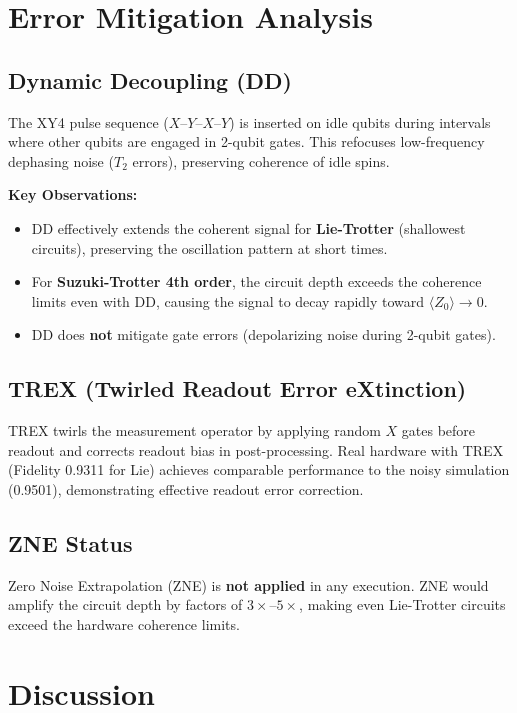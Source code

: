 \documentclass[11pt,a4paper]{article}
\begin{document}
\section{Error Mitigation Analysis}

\subsection{Dynamic Decoupling (DD)}
The XY4 pulse sequence ($X$--$Y$--$X$--$Y$) is inserted on idle qubits during intervals where other qubits are engaged in 2-qubit gates. 
This refocuses low-frequency dephasing noise ($T_2$ errors), preserving coherence of idle spins.

\textbf{Key Observations:}
\begin{itemize}
    \item DD effectively extends the coherent signal for \textbf{Lie-Trotter} (shallowest circuits), preserving the oscillation pattern at short times.
    \item For \textbf{Suzuki-Trotter 4th order}, the circuit depth exceeds the coherence limits even with DD, causing the signal to decay rapidly toward $\langle Z_0 \rangle \to 0$.
    \item DD does \textbf{not} mitigate gate errors (depolarizing noise during 2-qubit gates).
\end{itemize}

\subsection{TREX (Twirled Readout Error eXtinction)}
TREX twirls the measurement operator by applying random $X$ gates before readout and corrects readout bias in post-processing. 
Real hardware with TREX (Fidelity 0.9311 for Lie) achieves comparable performance to the noisy simulation (0.9501), demonstrating effective readout error correction.

\subsection{ZNE Status}
Zero Noise Extrapolation (ZNE) is \textbf{not applied} in any execution. ZNE would amplify the circuit depth by factors of $3\times$--$5\times$, making even Lie-Trotter circuits exceed the hardware coherence limits.

\section{Discussion}
\end{document}
